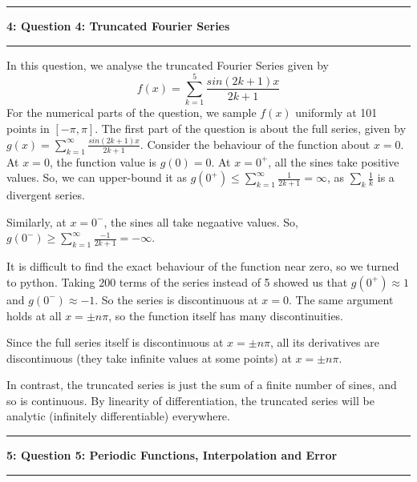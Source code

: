 \documentclass[11pt]{article}
\newcommand\question[2]{\vspace{.25in}\hrule\textbf{#1: #2}\vspace{.5em}\hrule\vspace{.10in}}
\begin{document}
\question{4}{Question 4: Truncated Fourier Series}

In this question, we analyse the truncated Fourier Series given by 
\begin{equation}
f(x) = \sum_{k=1}^5 \frac{sin(2k+1)x}{2k+1}
\end{equation}
For the numerical parts of the question, we sample $f(x)$ uniformly at 101 points in $[-\pi,\pi]$. The first part of the question is about the full series, given by $g(x)=\sum_{k=1}^{\infty} \frac{sin(2k+1)x}{2k+1}$. Consider the behaviour of the function about $x=0$. At $x=0$, the function value is $g(0)=0$. At $x=0^{+}$, all the sines take positive values. So, we can upper-bound it as $g(0^+) \leq \sum_{k=1}^{\infty} \frac{1}{2k+1} = \infty$, as $\sum_k \frac{1}{k}$ is a divergent series. 

Similarly, at $x=0^{-}$, the sines all take negaative values. So, $g(0^-) \geq \sum_{k=1}^{\infty} \frac{-1}{2k+1} = -\infty$. 

It is difficult to find the exact behaviour of the function near zero, so we turned to python. Taking $200$ terms of the series instead of 5 showed us that $g(0^+)\approx 1$ and $g(0^-)\approx -1$. So the series is discontinuous at $x=0$. The same argument holds at all $x=\pm n\pi$, so the function itself has many discontinuities. 

Since the full series itself is discontinuous at $x=\pm n\pi$, all its derivatives are discontinuous (they take infinite values at some points) at $x=\pm n\pi$. 

In contrast, the truncated series is just the sum of a finite number of sines, and so is continuous. By linearity of differentiation, the truncated series will be analytic (infinitely differentiable) everywhere. 
    
\pagebreak
    
    
\question{5}{Question 5: Periodic Functions, Interpolation and Error}
\end{document}
